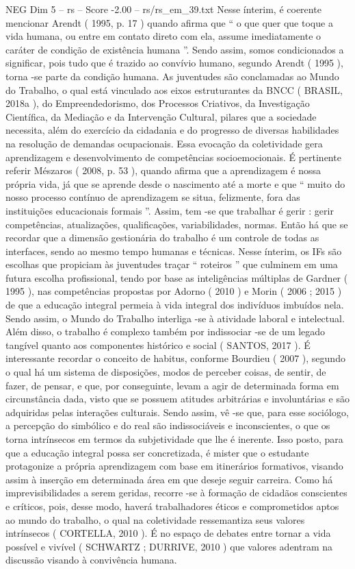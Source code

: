 \begin{textsample}{NEG Dim 5 – rs – Score -2.00 – rs/rs\_em\_39.txt}
Nesse ínterim, é coerente mencionar Arendt ( 1995, p. 17 ) quando afirma que “ o que quer que toque a vida humana, ou entre em contato direto com ela, assume imediatamente o caráter de condição de existência humana ”.
Sendo assim, somos condicionados a significar, pois tudo que é trazido ao convívio humano, segundo Arendt ( 1995 ), torna -se parte da condição humana.
As juventudes são conclamadas ao Mundo do Trabalho, o qual está vinculado aos eixos estruturantes da BNCC ( BRASIL, 2018a ), do Empreendedorismo, dos Processos Criativos, da Investigação Científica, da Mediação e da Intervenção Cultural, pilares que a sociedade necessita, além do exercício da cidadania e do progresso de diversas habilidades na resolução de demandas ocupacionais.
Essa evocação da coletividade gera aprendizagem e desenvolvimento de competências socioemocionais.
É pertinente referir Mészaros ( 2008, p. 53 ), quando afirma que a aprendizagem é nossa própria vida, já que se aprende desde o nascimento até a morte e que “ muito do nosso processo contínuo de aprendizagem se situa, felizmente, fora das instituições educacionais formais ”.
Assim, tem -se que trabalhar é gerir : gerir competências, atualizações, qualificações, variabilidades, normas.
Então há que se recordar que a dimensão gestionária do trabalho é um controle de todas as interfaces, sendo ao mesmo tempo humanas e técnicas.
Nesse ínterim, os IFs são escolhas que propiciam às juventudes traçar “ roteiros ” que culminem em uma futura escolha profissional, tendo por base as inteligências múltiplas de Gardner ( 1995 ), nas competências propostas por Adorno ( 2010 ) e Morin ( 2006 ; 2015 ) de que a educação integral permeia à vida integral dos indivíduos imbuídos nela.
Sendo assim, o Mundo do Trabalho interliga -se à atividade laboral e intelectual.
Além disso, o trabalho é complexo também por indissociar -se de um legado tangível quanto aos componentes histórico e social ( SANTOS, 2017 ).
É interessante recordar o conceito de habitus, conforme Bourdieu ( 2007 ), segundo o qual há um sistema de disposições, modos de perceber coisas, de sentir, de fazer, de pensar, e que, por conseguinte, levam a agir de determinada forma em circunstância dada, visto que se possuem atitudes arbitrárias e involuntárias e são adquiridas pelas interações culturais.
Sendo assim, vê -se que, para esse sociólogo, a percepção do simbólico e do real são indissociáveis e inconscientes, o que os torna intrínsecos em termos da subjetividade que lhe é inerente.
Isso posto, para que a educação integral possa ser concretizada, é mister que o estudante protagonize a própria aprendizagem com base em itinerários formativos, visando assim à inserção em determinada área em que deseje seguir carreira.
Como há imprevisibilidades a serem geridas, recorre -se à formação de cidadãos conscientes e críticos, pois, desse modo, haverá trabalhadores éticos e comprometidos aptos ao mundo do trabalho, o qual na coletividade ressemantiza seus valores intrínsecos ( CORTELLA, 2010 ).
É no espaço de debates entre tornar a vida possível e vivível ( SCHWARTZ ; DURRIVE, 2010 ) que valores adentram na discussão visando à convivência humana.

\end{textsample}
